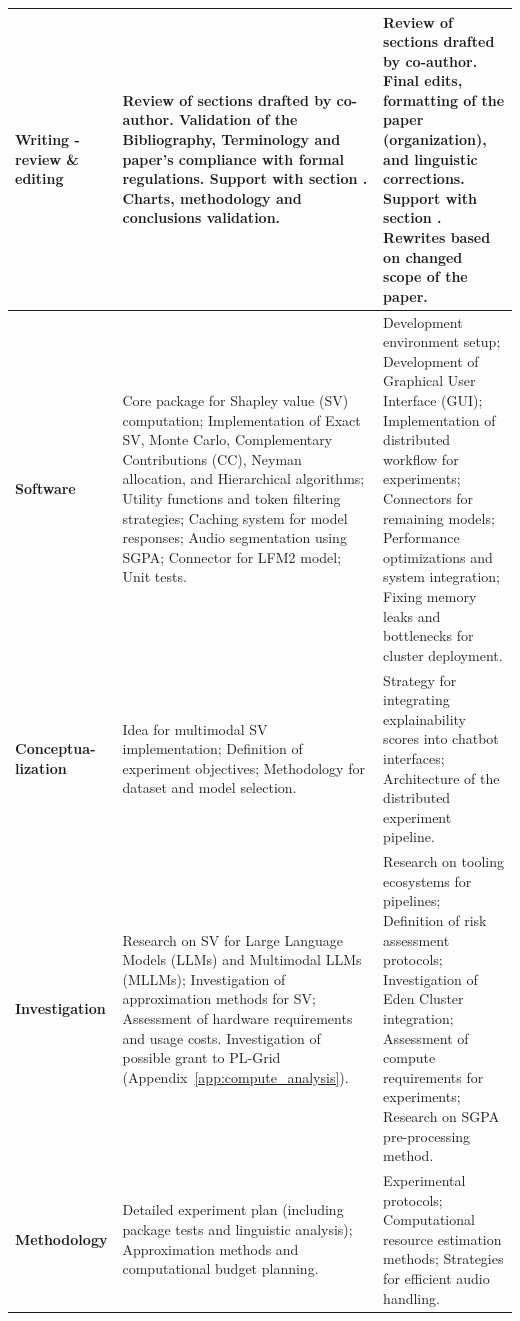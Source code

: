 \begin{longtable}{| L{2.5cm} | L{6cm} | L{6cm} |}
    \textbf{Writing - review \& editing} &
    Review of sections drafted by co-author. Validation of the Bibliography, Terminology and paper's compliance with formal regulations. Support with section . Charts, methodology and conclusions validation. &
    Review of sections drafted by co-author. Final edits, formatting of the paper (organization), and linguistic corrections. Support with section . Rewrites based on changed scope of the paper. \\
    \hline

    \textbf{Software} &
    Core package for Shapley value (SV) computation; Implementation of Exact SV, Monte Carlo, Complementary Contributions (CC), Neyman allocation, and Hierarchical algorithms; Utility functions and token filtering strategies; Caching system for model responses; Audio segmentation using SGPA; Connector for LFM2 model; Unit tests. &
    Development environment setup; Development of Graphical User Interface (GUI); Implementation of distributed workflow for experiments; Connectors for remaining models; Performance optimizations and system integration; Fixing memory leaks and bottlenecks for cluster deployment. \\
    \hline

    \textbf{Conceptua-\allowbreak lization} &
    Idea for multimodal SV implementation; Definition of experiment objectives; Methodology for dataset and model selection. &
    Strategy for integrating explainability scores into chatbot interfaces; Architecture of the distributed experiment pipeline. \\
    \hline

    \textbf{Investigation} &
    Research on SV for Large Language Models (LLMs) and Multimodal LLMs (MLLMs); Investigation of approximation methods for SV; Assessment of hardware requirements and usage costs. Investigation of possible grant to PL-Grid (Appendix~\ref{app:compute_analysis}). &
    Research on tooling ecosystems for pipelines; Definition of risk assessment protocols; Investigation of Eden Cluster integration; Assessment of compute requirements for experiments; Research on SGPA pre-processing method.\\
    \hline

    \textbf{Methodology} &
    Detailed experiment plan (including package tests and linguistic analysis); Approximation methods and computational budget planning. &
    Experimental protocols; Computational resource estimation methods; Strategies for efficient audio handling. \\
    \hline


\end{longtable}
